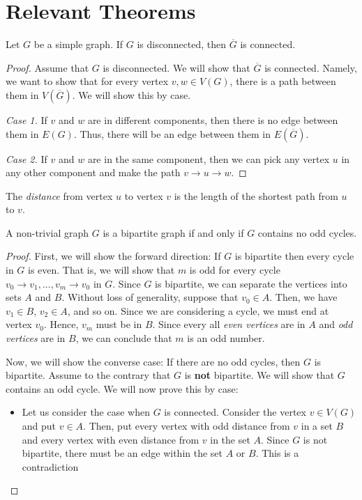 \section{Relevant Theorems}

\begin{theorem}
  Let \(G\) be a simple graph. If \(G\) is disconnected, then \(\overline{G}\) is connected.
\end{theorem}

\begin{proof}
  Assume that \(G\) is disconnected. We will show that \(\overline{G}\) is
  connected. Namely, we want to show that for every vertex \(v, w \in
  V({G})\), there is a path between them in \(V(\overline{G})\). We will show
  this by case.

  \textit{Case 1.} If \(v\) and \(w\) are in different components, then there
  is no edge between them in \(E(G)\). Thus, there will be an edge between them
  in \(E(\overline{G})\).

  \textit{Case 2.} If \(v\) and \(w\) are in the same component, then we can
  pick any vertex \(u\) in any other component and make the path \(v \to u \to
  w\).
\end{proof}

\begin{definition}[Distance]
  The \textit{distance} from vertex \(u\) to vertex \(v\) is the length of the
  shortest path from \(u\) to \(v\).
\end{definition}

\begin{theorem}
  A non-trivial graph \(G\) is a bipartite graph if and only if \(G\) contains
  no odd cycles.
\end{theorem}

\begin{proof}
  First, we will show the forward direction: If \(G\) is bipartite then
  every cycle in \(G\) is even. That is, we will show that
  \(m\) is odd for every cycle \(v_0 \to
  v_1, ..., v_m \to v_0\) in \(G\). Since \(G\) is bipartite, we can separate
  the vertices into sets \(A\) and \(B\). Without loss of generality, suppose
  that \(v_0 \in A\). Then, we have \(v_1 \in B\), \(v_2 \in A\), and so on.
  Since we are considering a cycle, we must end at vertex \(v_0\). Hence,
  \(v_m\) must be in \(B\). Since every all \textit{even vertices} are in \(A\) and \textit{odd vertices} are in \(B\), we can conclude that \(m\) is an odd number.  

  Now, we will show the converse case: If there are no odd cycles, then \(G\) is bipartite. Assume to the contrary that \(G\) is \textbf{not} bipartite. We will show that \(G\) contains an odd cycle. We will now prove this by case:
  \begin{itemize}
    \item Let us consider the case when \(G\) is connected. Consider the vertex \(v \in V(G)\) and put \(v \in A\). Then, put every vertex with odd distance from \(v\) in a set \(B\) and every vertex with even distance from \(v\) in the set \(A\). Since \(G\) is not bipartite, there must be an edge within the set \(A\) or \(B\). This is a contradiction 
  \end{itemize}
\end{proof}

